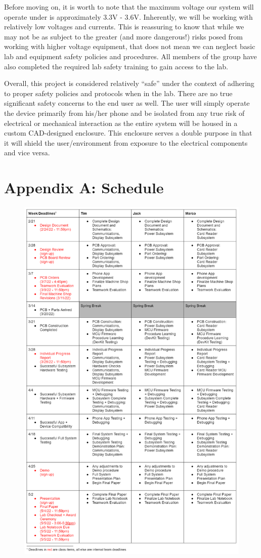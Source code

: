 \documentclass[12pt]{article}
\begin{document}
Before moving on, it is worth to note that the maximum voltage our system will operate under is approximately 3.3V - 3.6V. Inherently, we will be working with relatively low voltages and currents. This is reassuring to know that while we may not be as subject to the greater (and more dangerous!) risks posed from working with higher voltage equipment, that does not mean we can neglect basic lab and equipment safety policies and procedures. All members of the group have also completed the required lab safety training to gain access to the lab. 

Overall, this project is considered relatively ``safe'' under the context of adhering to proper safety policies and protocols when in the lab. There are no true significant safety concerns to the end user as well. The user will simply operate the device primarily from his/her phone and be isolated from any true risk of electrical or mechanical interaction as the entire system will be housed in a custom CAD-designed enclosure. This enclosure serves a double purpose in that it will shield the user/environment from exposure to the electrical components and vice versa. 




\newpage
\section{Appendix A: Schedule}
\begin{figure}[!h]
	\centering
	\includegraphics[height=0.93\textheight]{Schedule.png}
\end{figure}
\end{document}
